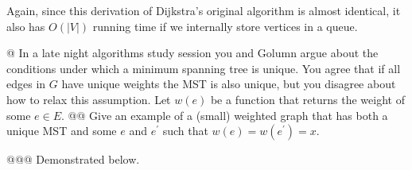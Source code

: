 \documentclass[10pt]{article}\usepackage[]{graphicx}\usepackage[]{xcolor}
\newenvironment{knitrout}{}{} %
\begin{document}
\begin{easylist}[enumerate]
    Again, since this derivation of Dijkstra's original algorithm is almost identical, it also has $O(|V|)$ running time
    if we internally store vertices in a queue.

    @ In a late night algorithms study session you and Golumn argue about the conditions under which a minimum spanning
    tree is unique. You agree that if all edges in $G$ have unique weights the MST is also unique, but you disagree
    about how to relax this assumption. Let $w(e)$ be a function that returns the weight of some $e \in E$.
    @@ Give an example of a (small) weighted graph that has both a unique MST and some $e$ and $e^\prime$ such that
    $w(e) = w(e^\prime) = x$.

    @@@ Demonstrated below.

\begin{knitrout}
\color{fgcolor}\begin{figure}[H]
\end{figure}
\end{knitrout}
\end{easylist}
\end{document}

